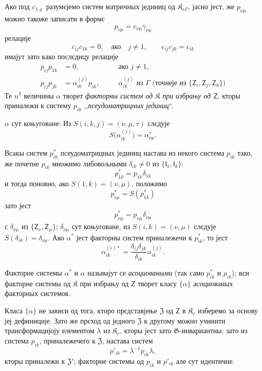 \documentclass[11pt]{article}
\begin{document}
Ако под \(c_{\lambda\varrho}\) разумєјемо систем матричных јединиц од \(\mathfrak K_{r\Gamma}\), јасно јест, же \(p_{\nu\mu}\) можно такоже записати в формє
\[
p_{\nu\mu}=c_{\nu\mu}\bar\gamma_{\nu\mu}
\]
релације
\[
c_{ij}c_{1k}=0,\quad\text{ако}\quad j\ne1,
\qquad
c_{ij}c_{jk}=c_{ik}
\]
имајут зато како послєдицу релације
\[
\begin{aligned}
p_{ij}p_{1k}&=0,\quad &&\text{ако }j\ne1,\\
p_{ij}p_{jk}&=\alpha_{ik}^{(j)}p_{ik},\quad
&&\alpha_{ik}^{(j)}\text{ из }\Gamma\text{ (точнеје из }\{\mathsf{Z}_i,\mathsf{Z}_j,\mathsf{Z}_k\}\text{)}
\end{aligned}
\]
Те \(n^3\) величины \(\alpha\) творет \emph{факторны систем од \(\mathfrak K\) при избрању од \(\mathsf{Z}\)}, кторы приналежи к систему \(p_{ik}\) ,,\emph{псеудоматрицных јединиц}``.

\(\alpha\) сут коњуговане: Из \(S(i,k,j)=(\nu,\mu,\tau)\) слєдује
\[
S\bigl(\alpha_{ik}^{(j)}\bigr)=\alpha_{\nu\mu}^{\tau}.
\]

Всакы систем \(p_{ik}^*\) псеудоматрицных јединиц настава из некого система \(p_{ik}\) тако, же почетне \(p_{ik}\) множимо либовољными \(\delta_{ik}\ne0\) из \(\{\mathfrak l_1,\mathfrak l_k\}\):
\[
p_{1k}^*=p_{1k}\delta_{1k}
\]
и тогда поновно, ако \(S(1,k)=(\nu,\mu)\), положимо
\[
p_{\nu\mu}^*=S(p_{1k}^*)
\]
зато јест
\[
p_{\nu\mu}^*=p_{\nu\mu}\delta_{\nu\mu}
\]
с \(\delta_{\nu\mu}\) из \(\{\mathsf{Z}_\nu,\mathsf{Z}_\mu\}\); \(\delta_{\nu\mu}\) сут коњуговане, из \(S(i,k)=(\nu,\mu)\) слєдује \(S(\delta_{ik})=\delta_{\nu\mu}\). Ако \(\alpha^*\) јест факторны систем приналежечи к \(p_{ik}^*\), то јест
\[
\alpha_{ik}^{(i)*}=\frac{\delta_{ij}\delta_{jk}}{\delta_{ik}}\alpha_{ik}^{(j)}.
\]

Факторне системы \(\alpha^*\) и \(\alpha\) называјут се \emph{асоциоваными} (так само \(p_{ik}^*\) и \(p_{ik}\)); вси факторне системы од \(\mathfrak K\) при избрању од \(\mathsf{Z}\) творет класу \(\{\alpha\}\) асоциованых факторных системов.

Класа \(\{\alpha\}\) не зависи од тога, кторо прєдставјење \(\mathfrak Z\) од \(\mathsf{Z}\) в \(\mathfrak K_r\) изберемо за основу јеј дефиниције. Зато же прєход од једного \(\mathfrak Z\) к другому можно учинити трансформацијоју елементом \(\lambda\) из \(\mathfrak K_r\), кторы јест зато \(\mathfrak G\)-инвариантны; зато из система \(p_{ik}\), приналежечего к \(\mathfrak Z\), настава систем
\[
p'_{ik}=\lambda^{-1}p_{ik}\lambda,
\]
кторы приналежи к \(\mathfrak Z'\); факторне системы од \(p_{ik}\) и \(p'_{ik}\) але сут идентичне.
\end{document}
